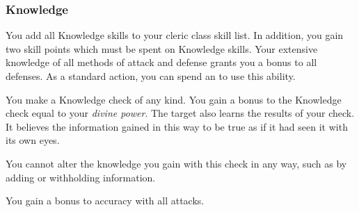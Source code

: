         \subsubsection{Knowledge}
             You add all Knowledge skills to your cleric class skill list.
            In addition, you gain two skill points which must be spent on Knowledge skills.
             Your extensive knowledge of all methods of attack and defense grants you a  bonus to all defenses.
             As a standard action, you can spend an  to use this ability.
            \begin{ability}
                \begin{spelltargetinginfo}
                \end{spelltargetinginfo}
                \begin{spelleffects}
                    \spelleffect You make a Knowledge check of any kind.
                    You gain a bonus to the Knowledge check equal to your \textit{divine power}.
                    The target also learns the results of your check.
                    It believes the information gained in this way to be true as if it had seen it with its own eyes.
                    \par You cannot alter the knowledge you gain with this check in any way, such as by adding or withholding information.
                \end{spelleffects}
            \end{ability}
             You gain a  bonus to accuracy with all attacks.

